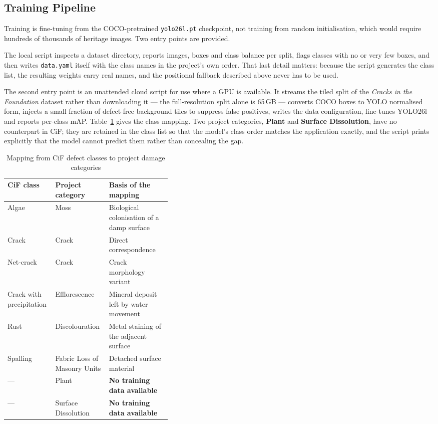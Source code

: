 \documentclass[a4paper,12pt,oneside]{book}
\begin{document}
\subsection{Training Pipeline}
Training is fine-tuning from the COCO-pretrained \texttt{yolo26l.pt} checkpoint, not training from random initialisation, which would require hundreds of thousands of heritage images. Two entry points are provided.

The local script inspects a dataset directory, reports images, boxes and class balance per split, flags classes with no or very few boxes, and then writes \texttt{data.yaml} itself with the class names in the project's own order. That last detail matters: because the script generates the class list, the resulting weights carry real names, and the positional fallback described above never has to be used.

The second entry point is an unattended cloud script for use where a GPU is available. It streams the tiled split of the \textit{Cracks in the Foundation} dataset \cite{farronato2026cif} rather than downloading it --- the full-resolution split alone is 65\,GB --- converts COCO boxes to YOLO normalised form, injects a small fraction of defect-free background tiles to suppress false positives, writes the data configuration, fine-tunes YOLO26l and reports per-class mAP. Table~\ref{tab:cifmap} gives the class mapping. Two project categories, \textbf{Plant} and \textbf{Surface Dissolution}, have no counterpart in CiF; they are retained in the class list so that the model's class order matches the application exactly, and the script prints explicitly that the model cannot predict them rather than concealing the gap.

\begin{table}[H]
\centering
\caption{Mapping from CiF defect classes to project damage categories}
\label{tab:cifmap}
\renewcommand{\arraystretch}{1.2}
{\footnotesize
\begin{tabular}{|l|l|p{0.38\linewidth}|}
\hline
\textbf{CiF class} & \textbf{Project category} & \textbf{Basis of the mapping} \\ \hline
Algae & Moss & Biological colonisation of a damp surface \\ \hline
Crack & Crack & Direct correspondence \\ \hline
Net-crack & Crack & Crack morphology variant \\ \hline
Crack with precipitation & Efflorescence & Mineral deposit left by water movement \\ \hline
Rust & Discolouration & Metal staining of the adjacent surface \\ \hline
Spalling & Fabric Loss of Masonry Units & Detached surface material \\ \hline
--- & Plant & \textbf{No training data available} \\ \hline
--- & Surface Dissolution & \textbf{No training data available} \\ \hline
\end{tabular}}
\end{table}
\end{document}

